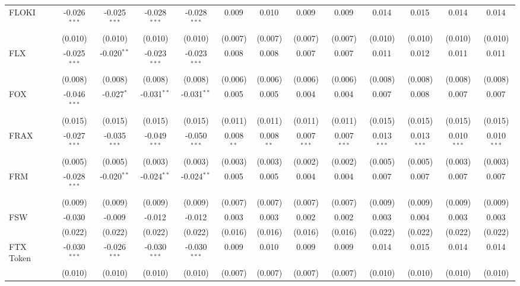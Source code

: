\begin{table}[!htbp]
\begin{tabular}{@{\extracolsep{5pt}}lcccccccccccc}
 FLOKI & -0.026$^{***}$ & -0.025$^{***}$ & -0.028$^{***}$ & -0.028$^{***}$ & 0.009$^{}$ & 0.010$^{}$ & 0.009$^{}$ & 0.009$^{}$ & 0.014$^{}$ & 0.015$^{}$ & 0.014$^{}$ & 0.014$^{}$ \\
  & (0.010) & (0.010) & (0.010) & (0.010) & (0.007) & (0.007) & (0.007) & (0.007) & (0.010) & (0.010) & (0.010) & (0.010) \\
 FLX & -0.025$^{***}$ & -0.020$^{**}$ & -0.023$^{***}$ & -0.023$^{***}$ & 0.008$^{}$ & 0.008$^{}$ & 0.007$^{}$ & 0.007$^{}$ & 0.011$^{}$ & 0.012$^{}$ & 0.011$^{}$ & 0.011$^{}$ \\
  & (0.008) & (0.008) & (0.008) & (0.008) & (0.006) & (0.006) & (0.006) & (0.006) & (0.008) & (0.008) & (0.008) & (0.008) \\
 FOX & -0.046$^{***}$ & -0.027$^{*}$ & -0.031$^{**}$ & -0.031$^{**}$ & 0.005$^{}$ & 0.005$^{}$ & 0.004$^{}$ & 0.004$^{}$ & 0.007$^{}$ & 0.008$^{}$ & 0.007$^{}$ & 0.007$^{}$ \\
  & (0.015) & (0.015) & (0.015) & (0.015) & (0.011) & (0.011) & (0.011) & (0.011) & (0.015) & (0.015) & (0.015) & (0.015) \\
 FRAX & -0.027$^{***}$ & -0.035$^{***}$ & -0.049$^{***}$ & -0.050$^{***}$ & 0.008$^{**}$ & 0.008$^{**}$ & 0.007$^{***}$ & 0.007$^{***}$ & 0.013$^{***}$ & 0.013$^{***}$ & 0.010$^{***}$ & 0.010$^{***}$ \\
  & (0.005) & (0.005) & (0.003) & (0.003) & (0.003) & (0.003) & (0.002) & (0.002) & (0.005) & (0.005) & (0.003) & (0.003) \\
 FRM & -0.028$^{***}$ & -0.020$^{**}$ & -0.024$^{**}$ & -0.024$^{**}$ & 0.005$^{}$ & 0.005$^{}$ & 0.004$^{}$ & 0.004$^{}$ & 0.007$^{}$ & 0.007$^{}$ & 0.007$^{}$ & 0.007$^{}$ \\
  & (0.009) & (0.009) & (0.009) & (0.009) & (0.007) & (0.007) & (0.007) & (0.007) & (0.009) & (0.009) & (0.009) & (0.009) \\
 FSW & -0.030$^{}$ & -0.009$^{}$ & -0.012$^{}$ & -0.012$^{}$ & 0.003$^{}$ & 0.003$^{}$ & 0.002$^{}$ & 0.002$^{}$ & 0.003$^{}$ & 0.004$^{}$ & 0.003$^{}$ & 0.003$^{}$ \\
  & (0.022) & (0.022) & (0.022) & (0.022) & (0.016) & (0.016) & (0.016) & (0.016) & (0.022) & (0.022) & (0.022) & (0.022) \\
 FTX Token & -0.030$^{***}$ & -0.026$^{***}$ & -0.030$^{***}$ & -0.030$^{***}$ & 0.009$^{}$ & 0.010$^{}$ & 0.009$^{}$ & 0.009$^{}$ & 0.014$^{}$ & 0.015$^{}$ & 0.014$^{}$ & 0.014$^{}$ \\
  & (0.010) & (0.010) & (0.010) & (0.010) & (0.007) & (0.007) & (0.007) & (0.007) & (0.010) & (0.010) & (0.010) & (0.010) \\

\end{tabular}
\end{table}
